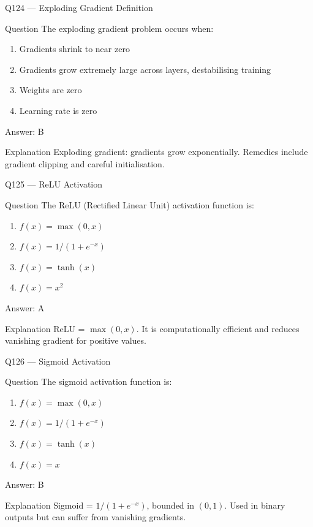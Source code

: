 \documentclass[aspectratio=169,8pt]{beamer}
\begin{document}
	\begin{frame}{Q124 --- Exploding Gradient Definition}
		\begin{block}{Question}
			The exploding gradient problem occurs when:
			\begin{enumerate}
				\item Gradients shrink to near zero
				\item Gradients grow extremely large across layers, destabilising training
				\item Weights are zero
				\item Learning rate is zero
			\end{enumerate}
		\end{block}
		\begin{exampleblock}{Answer: B}\end{exampleblock}
		\begin{block}{Explanation}
			Exploding gradient: gradients grow exponentially. Remedies include gradient clipping and careful initialisation.
		\end{block}
	\end{frame}
	
	\begin{frame}{Q125 --- ReLU Activation}
		\begin{block}{Question}
			The ReLU (Rectified Linear Unit) activation function is:
			\begin{enumerate}
				\item $f(x) = \max(0, x)$
				\item $f(x) = 1/(1+e^{-x})$
				\item $f(x) = \tanh(x)$
				\item $f(x) = x^2$
			\end{enumerate}
		\end{block}
		\begin{exampleblock}{Answer: A}\end{exampleblock}
		\begin{block}{Explanation}
			ReLU = $\max(0, x)$. It is computationally efficient and reduces vanishing gradient for positive values.
		\end{block}
	\end{frame}
	
	\begin{frame}{Q126 --- Sigmoid Activation}
		\begin{block}{Question}
			The sigmoid activation function is:
			\begin{enumerate}
				\item $f(x) = \max(0, x)$
				\item $f(x) = 1/(1+e^{-x})$
				\item $f(x) = \tanh(x)$
				\item $f(x) = x$
			\end{enumerate}
		\end{block}
		\begin{exampleblock}{Answer: B}\end{exampleblock}
		\begin{block}{Explanation}
			Sigmoid = $1/(1+e^{-x})$, bounded in $(0, 1)$. Used in binary outputs but can suffer from vanishing gradients.
		\end{block}
	\end{frame}
	
\end{document}
